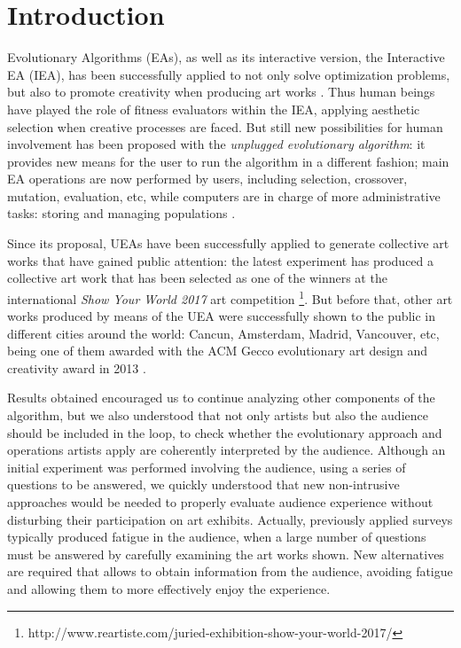 \documentclass[graybox]{svmult}
\begin{document}

\section{Introduction}
Evolutionary Algorithms (EAs), as well as its interactive version, the Interactive EA (IEA), has been successfully applied to not only solve optimization problems, but also to promote creativity when producing art works \cite{takagi2001interactive}.  Thus human beings have played the role of fitness evaluators within the IEA, applying aesthetic selection when creative processes are faced.  But still new possibilities for human involvement has been proposed with the \textit{unplugged evolutionary algorithm}:  it provides new means for the user to run the algorithm in a different fashion;  main EA operations are now performed by users, including selection, crossover, mutation, evaluation, etc, while computers are in charge of more administrative tasks:  storing and managing populations \cite{de2014unplugging}.
  
Since its proposal, UEAs have been successfully applied to generate collective art works that have gained public attention:  the latest experiment has produced a collective art work that has been selected as one of the winners at the international \textit{Show Your World 2017} art competition \footnote{http://www.reartiste.com/juried-exhibition-show-your-world-2017/}.  But before that, other art works produced by means of the UEA were successfully shown to the public in different cities around the world: Cancun, Amsterdam, Madrid, Vancouver, etc, being one of them awarded with the ACM Gecco evolutionary art design and creativity award in 2013 \cite{loiacono2014gecco}.

Results obtained encouraged us to continue analyzing other components of the algorithm, but we also understood that not only artists but also the audience should be included in the loop, to check whether the evolutionary approach and operations artists apply are coherently interpreted by the audience.  Although an initial experiment was performed involving the audience, using a series of questions to be answered, we quickly understood that new non-intrusive approaches would be needed to properly evaluate audience experience without disturbing their participation on art exhibits.  Actually, previously applied surveys typically produced fatigue in the audience, when a large number of questions must be answered by carefully examining the art works shown.  New alternatives are required that allows to obtain information from the audience, avoiding fatigue and allowing them to more effectively enjoy the experience.
\end{document}

